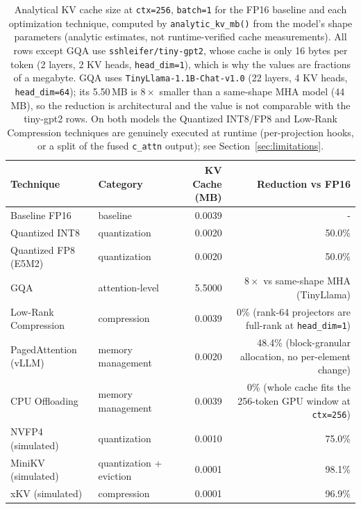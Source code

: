 \documentclass[conference]{IEEEtran}
\begin{document}
\begin{table}[htbp]
	\centering
	\caption{Analytical KV cache size at \texttt{ctx=256}, \texttt{batch=1} for the FP16 baseline and each optimization technique, computed by \texttt{analytic\_kv\_mb()} from the model's shape parameters (analytic estimates, not runtime-verified cache measurements). All rows except GQA use \texttt{sshleifer/tiny-gpt2}, whose cache is only 16 bytes per token (2 layers, 2 KV heads, \texttt{head\_dim=1}), which is why the values are fractions of a megabyte. GQA uses \texttt{TinyLlama-1.1B-Chat-v1.0} (22 layers, 4 KV heads, \texttt{head\_dim=64}); its 5.50\,MB is $8\times$ smaller than a same-shape MHA model (44\,MB), so the reduction is architectural and the value is not comparable with the tiny-gpt2 rows. On both models the Quantized INT8/FP8 and Low-Rank Compression techniques are genuinely executed at runtime (per-projection hooks, or a split of the fused \texttt{c\_attn} output); see Section~\ref{sec:limitations}.}
	\label{tab:results_summary}
	\small
	\begin{tabularx}{\linewidth}{lXrr}
		\toprule
		\textbf{Technique}     & \textbf{Category}              & \textbf{KV Cache (MB)} & \textbf{Reduction vs FP16} \\
		\midrule
		Baseline FP16           & baseline                       & 0.0039             & -                            \\
		\midrule
		Quantized INT8          & quantization                   & 0.0020             & 50.0\%                        \\
		\midrule
		Quantized FP8 (E5M2)    & quantization                   & 0.0020             & 50.0\%                        \\
		\midrule
		GQA                     & attention-level                & 5.5000             & $8\times$ vs same-shape MHA (TinyLlama) \\
		\midrule
		Low-Rank Compression    & compression                    & 0.0039             & 0\% (rank-64 projectors are full-rank at \texttt{head\_dim=1}) \\
		\midrule
		PagedAttention (vLLM)   & memory management              & 0.0020             & 48.4\% (block-granular allocation, no per-element change) \\
		\midrule
		CPU Offloading          & memory management              & 0.0039             & 0\% (whole cache fits the 256-token GPU window at \texttt{ctx=256}) \\
		\midrule
		NVFP4 (simulated)       & quantization                   & 0.0010             & 75.0\%                        \\
		\midrule
		MiniKV (simulated)      & quantization + eviction        & 0.0001             & 98.1\%                        \\
		\midrule
		xKV (simulated)         & compression                    & 0.0001             & 96.9\%                        \\
		\bottomrule
	\end{tabularx}
\end{table}
\end{document}
